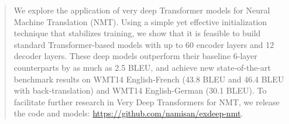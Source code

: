 
\begin{abstract}

We explore the application of very deep Transformer models for Neural Machine Translation (NMT). 
Using a simple yet effective initialization technique that stabilizes training, we show that it is feasible to build standard Transformer-based models with up to 60 encoder layers and 12 decoder layers. 
These deep models outperform their baseline 6-layer counterparts by as much as 2.5 BLEU, and achieve
new state-of-the-art benchmark results on 
WMT14 English-French (43.8 BLEU and 46.4 BLEU with back-translation) and WMT14 English-German (30.1 BLEU).
To facilitate further research in Very Deep Transformers for NMT, we release the code and models: \url{https://github.com/namisan/exdeep-nmt}.
\end{abstract}
